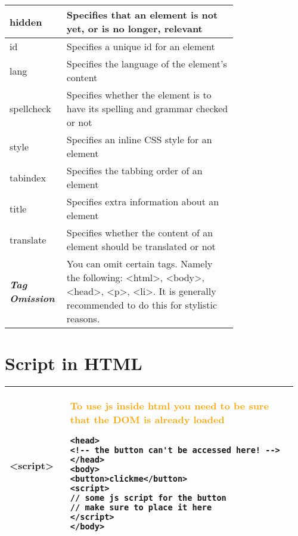 \documentclass[main.tex,fontsize=8pt,paper=a4,paper=portrait,DIV=calc,]{scrartcl}
\begin{document}
\begin{table}[h!]
\begin{tabular}{|p{0,2\linewidth}|p{0.755\linewidth}|}
\hline
hidden &	Specifies that an element is not yet, or is no longer, relevant\\
\hline
id & Specifies a unique id for an element\\
\hline
lang & Specifies the language of the element's content\\
\hline
spellcheck & Specifies whether the element is to have its spelling and grammar checked or not\\
\hline
style & Specifies an inline CSS style for an element\\
\hline
tabindex & Specifies the tabbing order of an element\\
\hline
title & Specifies extra information about an element\\
\hline
translate & Specifies whether the content of an element should be translated or not\\
\hline
\textbf{\emph{Tag Omission}} & You can omit certain tags. Namely the following: <html>, <body>, <head>, <p>, <li>.\newline
It is generally recommended to do this for stylistic reasons.\\
\hline
\end{tabular}
\section{Script in HTML}
\begin{tabular}{|m{0.2\linewidth}|m{0.755\linewidth}|}
\hline
<script> & 
\textcolor{orange}{To use js inside html you need to be sure that the DOM is already loaded}\newline
\begin{lstlisting}
<head>
<!-- the button can't be accessed here! -->
</head>
<body>
<button>clickme</button>
<script> 
// some js script for the button
// make sure to place it here
</script>
</body>
\end{lstlisting}\\
\hline
\end{tabular}
\end{table}
\pagebreak
\end{document}
